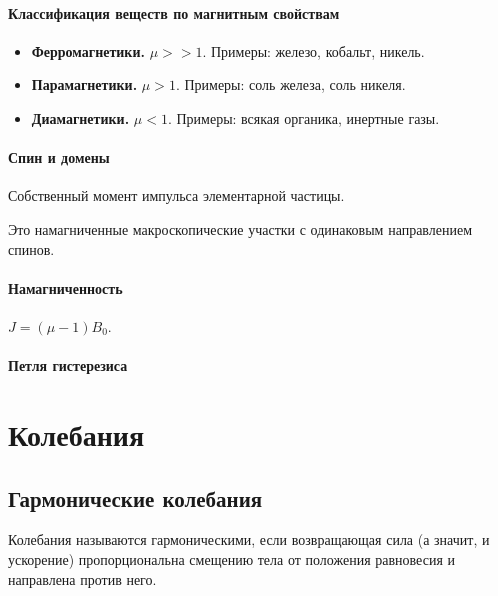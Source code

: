 \documentclass[12pt]{article}
\begin{document}
	\paragraph{Классификация веществ по магнитным свойствам}
	
	\begin{itemize}
		\item \textbf{Ферромагнетики.} $\mu >> 1$. Примеры: железо, кобальт, никель.
		\item \textbf{Парамагнетики.} $\mu > 1$. Примеры: соль железа, соль никеля.
		\item \textbf{Диамагнетики.} $\mu < 1$. Примеры: всякая органика, инертные газы.
	\end{itemize}
	
	\paragraph{Спин и домены}
	
	\begin{definition}[Спин]
		Собственный момент импульса элементарной частицы.
	\end{definition}
	
	\begin{definition}[Домены]
		Это намагниченные макроскопические участки с одинаковым направлением спинов.
	\end{definition}
	
	\paragraph{Намагниченность}
	
	\begin{definition}[Намагниченность]
		$J = (\mu - 1) B_0$.
	\end{definition}
	
	\paragraph{Петля гистерезиса}
	
	\section{Колебания}
	
	\subsection{Гармонические колебания}
	
    \begin{definition}
    	Колебания называются гармоническими, если возвращающая сила (а значит, и ускорение) пропорциональна смещению тела от положения равновесия и направлена против него.
    \end{definition}
	
\end{document}

